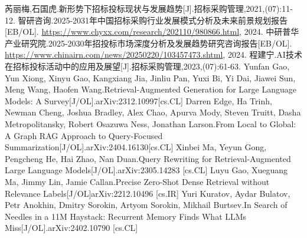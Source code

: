 \documentclass{xmu}
\begin{document}
\begin{reference}

    \begin{thebibliography}{5}
        芮丽梅,石国虎.新形势下招标投标现状与发展趋势[J].招标采购管理,2021,(07):11-12.
        智研咨询.2025-2031年中国招标采购行业发展模式分析及未来前景规划报告[EB/OL]. \url{https://www.chyxx.com/research/202110/980866.html}, 2024.
        中研普华产业研究院.2025-2030年招投标市场深度分析及发展趋势研究咨询报告[EB/OL]. \url{https://www.chinairn.com/news/20250220/103457473.shtml}, 2024.
        程建宁.AI技术在招标投标活动中的应用及展望[J].招标采购管理,2023,(07):61-63.
        Yunfan Gao, Yun Xiong, Xinyu Gao, Kangxiang Jia, Jinliu Pan, Yuxi Bi, Yi Dai, Jiawei Sun, Meng Wang, Haofen Wang.Retrieval-Augmented Generation for Large Language Models: A Survey[J/OL].arXiv:2312.10997[cs.CL]
        Darren Edge, Ha Trinh, Newman Cheng, Joshua Bradley, Alex Chao, Apurva Mody, Steven Truitt, Dasha Metropolitansky, Robert Osazuwa Ness, Jonathan Larson.From Local to Global: A Graph RAG Approach to Query-Focused Summarization[J/OL].arXiv:2404.16130[cs.CL]
        Xinbei Ma, Yeyun Gong, Pengcheng He, Hai Zhao, Nan Duan.Query Rewriting for Retrieval-Augmented Large Language Models[J/OL].arXiv:2305.14283 [cs.CL]
        Luyu Gao, Xueguang Ma, Jimmy Lin, Jamie Callan.Precise Zero-Shot Dense Retrieval without Relevance Labels[J/OL]arXiv:2212.10496 [cs.IR]
        Yuri Kuratov, Aydar Bulatov, Petr Anokhin, Dmitry Sorokin, Artyom Sorokin, Mikhail Burtsev.In Search of Needles in a 11M Haystack: Recurrent Memory Finds What LLMs Miss[J/OL].arXiv:2402.10790 [cs.CL]
    \end{thebibliography}
\end{reference}
\end{document}

